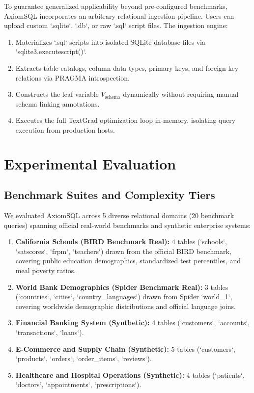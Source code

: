 \documentclass[conference]{IEEEtran}
\begin{document}
To guarantee generalized applicability beyond pre-configured benchmarks, AxiomSQL incorporates an arbitrary relational ingestion pipeline. Users can upload custom `.sqlite`, `.db`, or raw `.sql` script files. The ingestion engine:
\begin{enumerate}
    \item Materializes `.sql` scripts into isolated SQLite database files via `sqlite3.executescript()`.
    \item Extracts table catalogs, column data types, primary keys, and foreign key relations via PRAGMA introspection.
    \item Constructs the leaf variable $V_{\text{schema}}$ dynamically without requiring manual schema linking annotations.
    \item Executes the full TextGrad optimization loop in-memory, isolating query execution from production hosts.
\end{enumerate}

\section{Experimental Evaluation}

\subsection{Benchmark Suites and Complexity Tiers}
We evaluated AxiomSQL across 5 diverse relational domains (20 benchmark queries) spanning official real-world benchmarks and synthetic enterprise systems:
\begin{enumerate}
    \item \textbf{California Schools (BIRD Benchmark Real):} 4 tables (`schools`, `satscores`, `frpm`, `teachers`) drawn from the official BIRD benchmark, covering public education demographics, standardized test percentiles, and meal poverty ratios.
    \item \textbf{World Bank Demographics (Spider Benchmark Real):} 3 tables (`countries`, `cities`, `country_languages`) drawn from Spider `world_1`, covering worldwide demographic distributions and official language joins.
    \item \textbf{Financial Banking System (Synthetic):} 4 tables (`customers`, `accounts`, `transactions`, `loans`).
    \item \textbf{E-Commerce and Supply Chain (Synthetic):} 5 tables (`customers`, `products`, `orders`, `order_items`, `reviews`).
    \item \textbf{Healthcare and Hospital Operations (Synthetic):} 4 tables (`patients`, `doctors`, `appointments`, `prescriptions`).
\end{enumerate}
\end{document}
